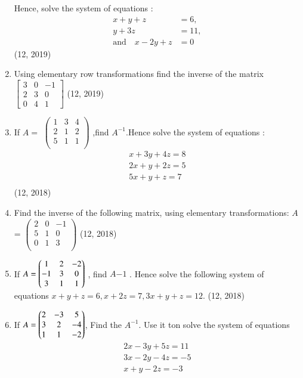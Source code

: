 \begin{enumerate}[label=\thesubsection.\arabic*,ref=\thesubsection.\theenumi]
Hence, solve the system of equations :
\begin{align*}
    x+y+z&=6 ,\\
    y+3z&=11 ,\\
    \text  {and} \hspace{12pt}x-2y+z&= 0
\end{align*}
\hfill (12, 2019)
\item Using elementary row transformations find the inverse of the matrix
		$\begin{bmatrix}
			3 & 0 &-1\\
			2 & 3 & 0\\
			0 & 4 &1
		\end{bmatrix}$
\hfill (12, 2019)
\item If $A=$ ${\begin{pmatrix}
    1 & 3 & 4\\
    2 & 1 & 2\\
    5 & 1 & 1\\
\end{pmatrix}}$
,find  ${A}^{-1}$.Hence solve the system of equations :
\begin{align*}
      {x + 3y + 4z = 8} \\
      {2x + y + 2z = 5}\\
    {5x + y + z = 7}\\
\end{align*}
\hfill (12, 2018)
\item Find the inverse of the following matrix, using elementary transformations:
$A$= ${\begin{pmatrix}
    2 & 0 & -1\\
    5 & 1 & 0\\
    0 & 1 & 3\\
\end{pmatrix}}$
\hfill (12, 2018)
  \item If $A=\begin{pmatrix}1&2&-2 \\-1 &3&0\\3&1&1\end{pmatrix}$ , find $A{-1}$ . Hence solve the following system of equations $x+y+z= 6,x+2z=7,3x+y+z=12$. 
\hfill (12, 2018)
\item If $A=\begin{pmatrix}2 & -3 & 5 \\ 3 & 2 & -4 \\ 1 & 1 & -2\end{pmatrix}$, Find the $A^{-1}$. Use it ton solve the system of equations 
	\begin{align*}
		2x-3y+5z=11 \\
		3x-2y-4z=-5\\
		x+y-2z=-3
	\end{align*}

\end{enumerate}

